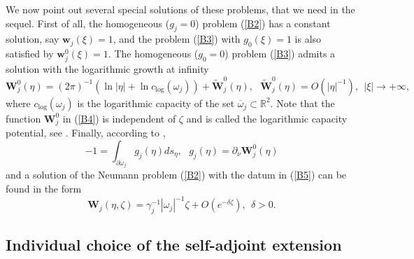 \documentclass[11pt]{article}%
\numberwithin{equation}{section}
\begin{document}
We now point out several special solutions of these problems, that we need in
the sequel. First of all, the homogeneous ($g_{j}=0$) problem (\ref{B2}) has a
constant solution, say $\mathbf{w}_{j}(\xi)=1$, and the problem (\ref{B3})
with $g_{0}(\xi)=1$ is also satisfied by $\mathbf{w}_{j}^{0}(\xi)=1$. The
homogeneous ($g_{0}=0$) problem (\ref{B3}) admits a solution with the
logarithmic growth at infinity%
\begin{equation}
\mathbf{W}_{j}^{0}\left(  \eta\right)  =(2\pi)^{-1}\left(  \ln|\eta|+\ln
c_{\log}\left(  \omega_{j}\right)  \right)  +\widetilde{\mathbf{W}}_{j}%
^{0}\left(  \eta\right)  ,\ \ \ \widetilde{\mathbf{W}}_{j}^{0}\left(
\eta\right)  =O\left(  |\eta|^{-1}\right)  ,\ \ |\xi|\rightarrow+\infty,
\label{B4}%
\end{equation}
where $c_{\log}\left(  \omega_{j}\right)  $ is the logarithmic capacity of the
set $\overline{\omega}_{j}\subset\mathbb{R}^{2}$. Note that the function
$\mathbf{W}_{j}^{0}$ in (\ref{B4}) is independent of $\zeta$ and is called the
logarithmic capacity potential, see \cite{PoSe, Land}. Finally, according to
\cite[Lemma 6]{BuCaNa1},%
\begin{equation}
-1=%
{\displaystyle\int_{\partial\omega_{j}}}
g_{j}\left(  \eta\right)  ds_{\eta},\ \ \ g_{j}\left(  \eta\right)
=\partial_{\nu}\mathbf{W}_{j}^{0}\left(  \eta\right)  \label{B5}%
\end{equation}
and a solution of the Neumann problem (\ref{B2}) with the datum in (\ref{B5})
can be found in the form%
\begin{equation}
\mathbf{W}_{j}\left(  \eta,\zeta\right)  =\gamma_{j}^{-1}|\omega_{j}%
|^{-1}\zeta+O(e^{-\delta\zeta}),\ \ \delta>0. \label{B6}%
\end{equation}


\subsection{Individual choice of the self-adjoint extension\label{sect3.2}}
\end{document}
